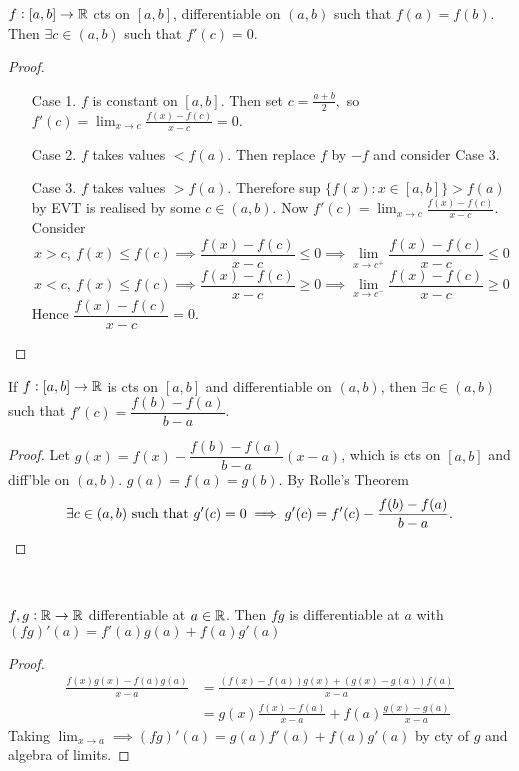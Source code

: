 \begin{theorem}
	$f:[a,b] \to \mathbb{R}$ cts on $[a,b]$, differentiable on $(a,b)$ such that $f(a) = f(b)$. Then $\exists c \in (a,b)$ such that $f'(c) = 0$.
\end{theorem}
\begin{proof}~
\begin{enumerate}
\item[Case 1.] $f$ is constant on $[a,b]$. Then set $c = \frac{a+b}{2},$ so $f'(c) = \lim_{x\to c}\frac{f(x) - f(c)}{x-c} = 0$.
\item[Case 2.] $f$ takes values $< f(a)$. Then replace $f$ by $-f$ and consider Case 3.
\item[Case 3.] $f$ takes values $> f(a)$. Therefore sup $\{f(x): x \in [a,b]\} > f(a)$ by EVT is realised by some $c \in (a,b)$. Now $f'(c) = \lim_{x\to c} \frac{f(x) - f(c)}{x-c}$. Consider\\ 

 \[x > c,~f(x) \leq f(c) \implies \frac{f(x) - f(c)}{x-c} \leq 0 \implies \lim_{x \to c^{+}} \frac{f(x) - f(c)}{x-c} \leq 0\]
 \[x < c,~f(x) \leq f(c) \implies \frac{f(x) - f(c)}{x-c} \geq 0 \implies \lim_{x \to c^{-}} \frac{f(x) - f(c)}{x-c} \geq 0 \] 
 Hence  $\dfrac{f(x) - f(c)}{x-c} = 0$.\qedhere 
\end{enumerate}
	
\end{proof}\vspace*{5pt}

\vspace*{5pt}


\begin{theorem}
If $f:[a,b] \to \mathbb{R}$ is cts on $[a,b]$ and differentiable on $(a,b)$, then $\exists c \in (a,b)$ such that $f'(c) = \dfrac{f(b) - f(a)}{b-a}$.
\end{theorem}
\begin{proof}
Let $g(x) = f(x) - \dfrac{f(b) - f(a)}{b-a}(x-a)$, which is cts on $[a,b]$ and diff'ble on $(a,b)$. $g(a) = f(a) = g(b)$. By Rolle's Theorem
\[\exists c \in (a,b)\text{ such that }g'(c) = 0 \implies g'(c) = f'(c) - \dfrac{f(b) - f(a)}{b-a}.\qedhere\]	
\end{proof}~

\vspace*{5pt}

\begin{theorem} $f,g : \mathbb{R} \to \mathbb{R}$ differentiable at $a \in \mathbb{R}$. Then $fg$ is differentiable at $a$ with $(fg)'(a) = f'(a)g(a) + f(a)g'(a)$
\end{theorem}
\begin{proof}
\[\begin{aligned}
	\frac{f(x)g(x) - f(a)g(a)}{x-a} &= \frac{(f(x)-f(a))g(x) + (g(x) - g(a))f(a)}{x-a} \\ 
	&= g(x) \frac{f(x)-f(a)}{x-a} + f(a)\frac{g(x)-g(a)}{x-a}
\end{aligned}
\]
Taking $\lim_{x\to a} \implies (fg)'(a) = g(a)f'(a) + f(a)g'(a)$ by cty of $g$ and algebra of limits.
\end{proof}\vspace*{5pt}

